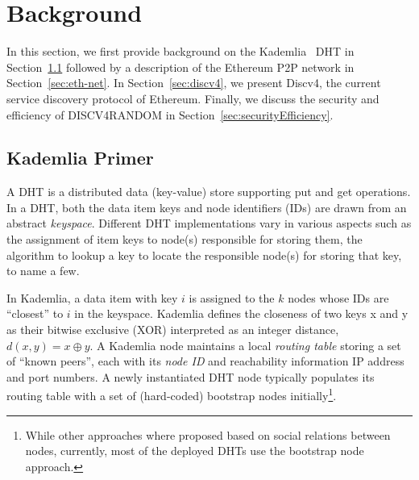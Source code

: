 


\section{Background}
\label{sec:background}

In this section, we first provide background on the Kademlia~\cite{maymounkov2002kademlia} DHT in Section~\ref{sec:kademlia} followed by a description of the Ethereum P2P network in Section~\ref{sec:eth-net}.  In Section~\ref{sec:discv4}, we present Discv4, the current service discovery protocol of Ethereum. Finally, we discuss the security and efficiency of DISCV4RANDOM in Section~\ref{sec:securityEfficiency}. 

\subsection{Kademlia Primer}
\label{sec:kademlia}

 A DHT is a distributed data (\ie key-value) store supporting put and get operations. In a DHT,
 both the data item keys and node identifiers (\ie IDs) are drawn from an abstract \textit{keyspace}. Different DHT implementations vary in various aspects such as the assignment of item keys to node(s) responsible for storing them, the algorithm to lookup a key to locate the responsible node(s) for storing that key, to name a few.

 In Kademlia, a data item with key $i$ is assigned to the $k$ nodes whose IDs are ``closest'' to $i$ in the keyspace. Kademlia defines the closeness of two keys x and y as their bitwise exclusive (XOR) interpreted as an integer distance, \ie $d(x,y) = x \oplus y$. A Kademlia node maintains a local \textit{routing table} storing a set of ``known peers'', each with its \textit{node ID} and reachability information \ie IP address and port numbers. A newly instantiated DHT node typically populates its routing table with a set of (hard-coded) bootstrap nodes initially\footnote{While other approaches where proposed based on social relations between nodes, currently, most of the deployed DHTs use the bootstrap node approach.}. 

